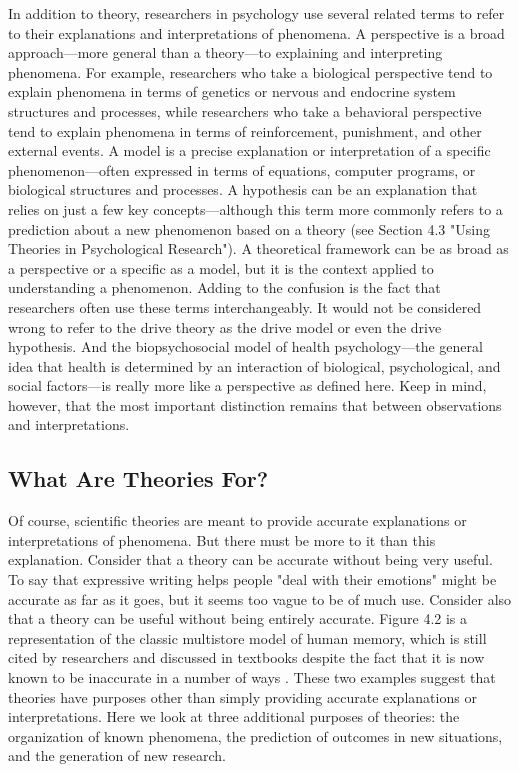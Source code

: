  In addition to theory, researchers in psychology use several related terms to refer to their explanations and interpretations of phenomena. A perspective is a broad approach---more general than a theory---to explaining and interpreting phenomena. For example, researchers who take a biological perspective tend to explain phenomena in terms of genetics or nervous and endocrine system structures and processes, while researchers who take a behavioral perspective tend to explain phenomena in terms of reinforcement, punishment, and other external events. A model is a precise explanation or interpretation of a specific phenomenon---often expressed in terms of equations, computer programs, or biological structures and processes. A hypothesis can be an explanation that relies on just a few key concepts---although this term more commonly refers to a prediction about a new phenomenon based on a theory (see Section 4.3 "Using Theories in Psychological Research"). A theoretical framework can be as broad as a perspective or a specific as a model, but it is the context applied to understanding a phenomenon. Adding to the confusion is the fact that researchers often use these terms interchangeably. It would not be considered wrong to refer to the drive theory as the drive model or even the drive hypothesis. And the biopsychosocial model of health psychology---the general idea that health is determined by an interaction of biological, psychological, and social factors---is really more like a perspective as defined here. Keep in mind, however, that the most important distinction remains that between observations and interpretations.

 \subsection{What Are Theories For?}


Of course, scientific theories are meant to provide accurate explanations or interpretations of phenomena. But there must be more to it than this explanation. Consider that a theory can be accurate without being very useful. To say that expressive writing helps people "deal with their emotions" might be accurate as far as it goes, but it seems too vague to be of much use. Consider also that a theory can be useful without being entirely accurate. Figure 4.2 is a representation of the classic multistore model of human memory, which is still cited by researchers and discussed in textbooks despite the fact that it is now known to be inaccurate in a number of ways \citep{izawa_human_1999}. These two examples suggest that theories have purposes other than simply providing accurate explanations or interpretations. Here we look at three additional purposes of theories: the organization of known phenomena, the prediction of outcomes in new situations, and the generation of new research.


